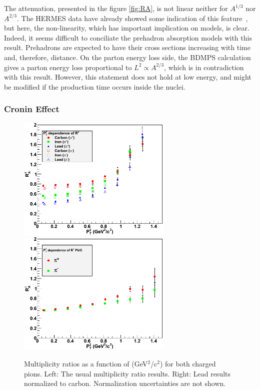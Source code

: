 The attenuation, presented in the figure \ref{fig:RA}, is not linear neither for $A^{1/3}$ nor $A^{2/3}$. The HERMES data have already showed some indication 
of this feature~\cite{Airapetian:2007vu,Airapetian:2009jy}, but here, the non-linearity, which has important implication on models, is clear. Indeed, it seems difficult to conciliate the prehadron absorption models with this result. Prehadrons 
are expected to have their cross sections increasing with time and, therefore, 
distance. On the parton energy loss side, the BDMPS calculation gives a parton energy loss proportional to $L^2 \propto A^{2/3}$, which is in contradiction with this result. However, this statement does not hold at low energy, and might be 
modified if the production time occurs inside the nuclei.

\subsubsection{Cronin Effect}

\begin{figure}[p]
\centering
\includegraphics[width=7.4cm] {chap6-fig/F_RvPt.png} 
\includegraphics[width=7.4cm] {chap6-fig/F_RvPt_PbC.png} 
\caption {Multiplicity ratios as a function of \pt (GeV$^2$/c$^2$) for both charged pions. Left: The usual multiplicity ratio results. Right: Lead results normalized to carbon. Normalization uncertainties are not shown.}
\label{fig:RPt}
\end{figure}

